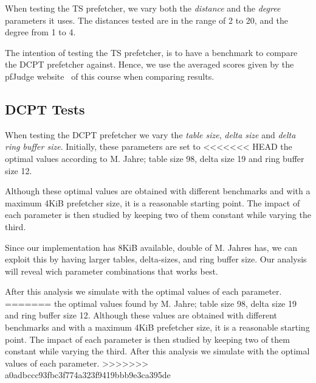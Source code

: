 When testing the TS prefetcher, we vary both the \emph{distance} and the
\emph{degree} parameters it uses. The distances tested are in the range of 2 to
20, and the degree from 1 to 4.

The intention of testing the TS prefetcher, is to have a benchmark to compare
the DCPT prefetcher against. Hence, we use the averaged scores given by the
pfJudge website~\cite[Sec.~2.5]{guidelines} of this course when comparing
results.

\subsection{DCPT Tests}

When testing the DCPT prefetcher we vary the \emph{table size}, \emph{delta
size} and \emph{delta ring buffer size}. Initially, these parameters are set to
<<<<<<< HEAD
the optimal values according to
M. Jahre\cite{dcpt}; table size 98, delta size 19 and ring buffer size 12.

Although these optimal values are obtained with different benchmarks and with a
maximum 4KiB prefetcher size, it is a reasonable starting point. The impact of
each parameter is then studied by keeping two of them constant while varying the
third.

Since our implementation has 8KiB available, double of M. Jahres \cite{dcpt}
has, we can exploit this by having larger tables, delta-sizes, and ring buffer
size. Our analysis will reveal wich parameter combinations that works best.

After this analysis we simulate with the optimal values of each parameter.
=======
the optimal values found by M. Jahre\cite{dcpt}; table size 98, delta size
19 and ring buffer size 12. Although these values are obtained with different benchmarks and with a
maximum 4KiB prefetcher size, it is a reasonable starting point. The impact of
each parameter is then studied by keeping two of them constant while varying the
third. After this analysis we simulate with the optimal values of each parameter.
>>>>>>> a0adbccc93fbc3f774a323f9419bbb9e3ca395de

